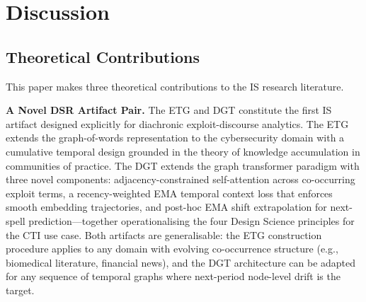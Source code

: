 \documentclass[12pt]{article}
\begin{document}
\section{Discussion}
\bodyfont

\subsection{Theoretical Contributions}

This paper makes three theoretical contributions to the IS research literature.

\textbf{A Novel DSR Artifact Pair.} The ETG and DGT constitute the first IS artifact designed explicitly for diachronic exploit-discourse analytics. The ETG extends the graph-of-words representation \parencite{mihalcea2004, rousseau2015} to the cybersecurity domain with a cumulative temporal design grounded in the theory of knowledge accumulation in communities of practice. The DGT extends the graph transformer paradigm \parencite{rampasek2022, kreuzer2021} with three novel components: adjacency-constrained self-attention across co-occurring exploit terms, a recency-weighted EMA temporal context loss that enforces smooth embedding trajectories, and post-hoc EMA shift extrapolation for next-spell prediction---together operationalising the four Design Science principles for the CTI use case. Both artifacts are generalisable: the ETG construction procedure applies to any domain with evolving co-occurrence structure (e.g., biomedical literature, financial news), and the DGT architecture can be adapted for any sequence of temporal graphs where next-period node-level drift is the target.
\end{document}
